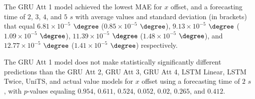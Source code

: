 \begin{table}[!ht]
	\centering
	\caption{The average MAE in $\degree$ ($\times 10^{-5}$), with standard deviation in brackets, across $k$-fold validation datasets for the $x$ offset estimated on the $k$-fold testing datasets by different RNN models, and forecasting times.}
	\label{tab:best_longitude_no_abs_MAE}
\end{table}

The GRU Att 1 model achieved the lowest MAE for $x$ offset, and a forecasting time of $2$, $3$, $4$, and $5$ $s$ with average values and standard deviation (in brackets) that equal $6.81 \times 10^{-5}$ $\degree$ ($0.85 \times 10^{-5}$ $\degree$), $9.13 \times 10^{-5}$ $\degree$ ($1.09 \times 10^{-5}$ $\degree$), $11.39 \times 10^{-5}$ $\degree$ ($1.48 \times 10^{-5}$ $\degree$), and $12.77 \times 10^{-5}$ $\degree$ ($1.41 \times 10^{-5}$ $\degree$) respectively.

The GRU Att 1 model does not make statistically significantly different predictions than the GRU Att 2, GRU Att 3, GRU Att 4, LSTM Linear, LSTM Twice, UniTS, and actual value models for $x$ offset using a forecasting time of $2$ $s$, with $p$-values equaling $0.954$, $0.611$, $0.524$, $0.052$, $0.02$, $0.265$, and $0.412$.

